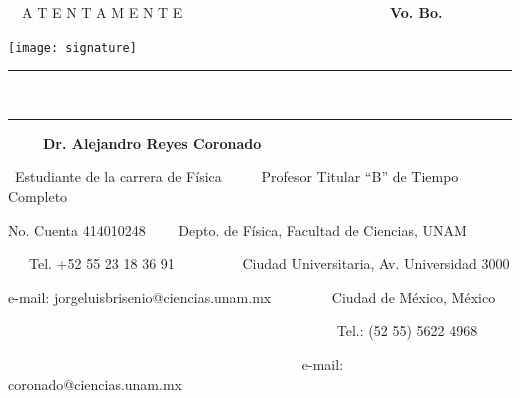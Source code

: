\documentclass[letter,12pt]{article}
\numberwithin{equation}{section}
\begin{document}
\vfill


\qquad \, \,  {A T E N T A M E N T E}  \, \, \, \, \, \, \,   \, \, \, \, \, \, \, \, \, \, \,   \, \, \, \, \, \, \, \, \, \, \,  \textbf{Vo. Bo.}

\vspace{3mm}

\texttt{[image: signature]}\qquad \\
\rule{0.4\textwidth}{0.4mm}  \qquad  \,   \rule{0.47\textwidth}{0.4mm} 

 \qquad \qquad \,   \, \,   \, \,  \textbf{Dr. Alejandro Reyes Coronado}

\quad \, Estudiante de la carrera de Física \qquad \,  \, \,  \, \,   Profesor Titular ``B” de Tiempo Completo

\qquad \qquad No. Cuenta 414010248 \qquad \qquad \, \, \, \,  Depto. de Física, Facultad de Ciencias, UNAM

\qquad \, \, \, Tel. +52 55 23 18 36 91 \qquad  \, \, \, \, \, \, \, \, \,  Ciudad Universitaria, Av. Universidad 3000

e-mail: jorgeluisbrisenio@ciencias.unam.mx \qquad     \, \, \, \,   \, \, \, \, Ciudad de México, México

\qquad \, \, \, \, \, \, \,   \, \, \, \, \, \, \, \, \, \,   \, \, \, \, \, \, \, \, \, \, \,   \, \, \, \, \, \, \, \, \, \, \,  \, \, \, \, \, \, \, \,    Tel.: (52 55) 5622 4968

\qquad \, \, \, \, \, \, \,   \, \, \, \, \, \, \, \, \, \, \,   \, \, \, \, \, \, \, \, \, \, \,   \, \, \, \, \, \, \, \, \, \, \,   \, \,  e-mail: coronado@ciencias.unam.mx
\end{document}
